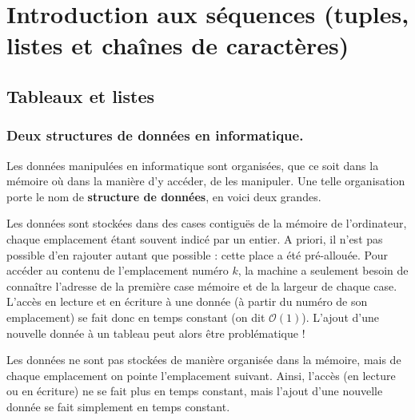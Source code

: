 \setchapterpreamble[u]{\margintoc}
\chapter{Introduction aux séquences (tuples, listes et chaînes de caractères)}



\section{Tableaux et listes}

\subsection{Deux structures de données en informatique.}

Les données manipulées en informatique sont organisées, que ce soit dans la mémoire où dans la manière d'y accéder, de les manipuler. 
Une telle organisation porte le nom de \textbf{structure de données}, en voici deux grandes.  

\begin{defi}[Tableaux]
  Les données sont stockées dans des cases contiguës de la mémoire de l'ordinateur, chaque emplacement étant souvent indicé par un entier. 
    A priori, il n'est pas possible d'en rajouter autant que possible : cette place a été pré-allouée. 
    Pour accéder au contenu de l'emplacement numéro $k$, la machine a seulement besoin de connaître 
l'adresse de la première case mémoire et de la largeur de chaque case. 
    L'accès en lecture et en écriture à une donnée (à partir du numéro de son emplacement) se fait donc en temps constant (on dit $\mathcal{O}(1)$).
    L'ajout d'une nouvelle donnée à un tableau peut alors être problématique !
\end{defi}

\begin{defi}
Les données ne sont pas stockées de manière organisée dans la mémoire, 
mais de chaque emplacement on pointe l'emplacement suivant. 
    Ainsi, l'accès (en lecture ou en écriture) ne se fait plus en temps constant, mais l'ajout d'une nouvelle donnée se fait simplement en temps constant. 
\end{defi}

